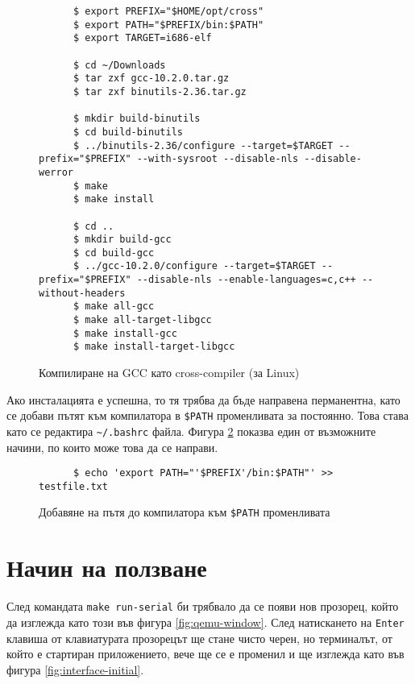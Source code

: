   \begin{figure}[htpb]
    \centering
    \begin{verbatim}
      $ export PREFIX="$HOME/opt/cross"
      $ export PATH="$PREFIX/bin:$PATH"
      $ export TARGET=i686-elf

      $ cd ~/Downloads
      $ tar zxf gcc-10.2.0.tar.gz
      $ tar zxf binutils-2.36.tar.gz

      $ mkdir build-binutils
      $ cd build-binutils
      $ ../binutils-2.36/configure --target=$TARGET --prefix="$PREFIX" --with-sysroot --disable-nls --disable-werror
      $ make
      $ make install

      $ cd ..
      $ mkdir build-gcc
      $ cd build-gcc
      $ ../gcc-10.2.0/configure --target=$TARGET --prefix="$PREFIX" --disable-nls --enable-languages=c,c++ --without-headers
      $ make all-gcc
      $ make all-target-libgcc
      $ make install-gcc
      $ make install-target-libgcc
    \end{verbatim}
    \caption{Компилиране на GCC като cross-compiler (за Linux)}
    \label{fig:compiling-gcc}
  \end{figure}

  Ако инсталацията е успешна, то тя трябва да бъде направена перманентна, като се добави пътят към компилатора в {\tt \$PATH} променливата за постоянно. Това става като се редактира {\tt \~{}/.bashrc} файла. Фигура \ref{fig:adding-to-path} показва един от възможните начини, по които може това да се направи.

  \begin{figure}[htpb]
    \centering
    \begin{verbatim}
      $ echo 'export PATH="'$PREFIX'/bin:$PATH"' >> testfile.txt
    \end{verbatim}
    \caption{Добавяне на пътя до компилатора към {\tt \$PATH} променливата}
    \label{fig:adding-to-path}
  \end{figure}

  \section{Начин на ползване}
  След командата {\tt make run-serial} би трябвало да се появи нов прозорец, който да изглежда като този във фигура \ref{fig:qemu-window}. След натискането на {\tt Enter} клавиша от клавиатурата прозорецът ще стане чисто черен, но терминалът, от който е стартиран приложението, вече ще се е променил и ще изглежда като във фигура \ref{fig:interface-initial}.

